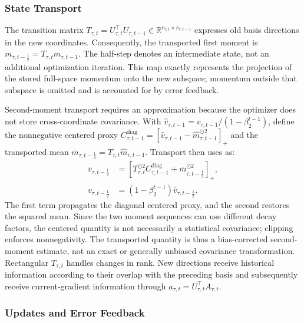 \documentclass[fleqn,10pt]{wlscirep}
\begin{document}
\subsubsection{State Transport}
\label{subsubsec:moment_transport}
\label{subsubsec:corrected_projection}
The transition matrix $T_{\tau,t}=U_{\tau,t}^{\top}U_{\tau,t-1} \in\mathbb{R}^{r_{\tau,t}\times r_{\tau,t-1}}$ expresses old basis directions in the new coordinates. Consequently, the transported first moment is $m_{\tau,t-\frac12}=T_{\tau,t}m_{\tau,t-1}$. The half-step denotes an intermediate state, not an additional optimization iteration. This map exactly represents the projection of the stored full-space momentum onto the new subspace; momentum outside that subspace is omitted and is accounted for by error feedback.

Second-moment transport requires an approximation because the optimizer does not store cross-coordinate covariance. With $\widehat v_{\tau,t-1}=v_{\tau,t-1}/(1-\beta_2^{t-1})$, define the nonnegative centered proxy $C_{\tau,t-1}^{\mathrm{diag}} =[\widehat v_{\tau,t-1}-\widehat m_{\tau,t-1}^{\odot2}]_+$ and the transported mean $\bar m_{\tau,t-\frac12}=T_{\tau,t}\widehat m_{\tau,t-1}$. Transport then uses as:
\begin{equation}
\begin{aligned}
\bar v_{\tau,t-\frac12}
&=\left[T_{\tau,t}^{\odot2}C_{\tau,t-1}^{\mathrm{diag}}
 +\bar m_{\tau,t-\frac12}^{\odot2}\right]_+,\\
v_{\tau,t-\frac12}
&=(1-\beta_2^{t-1})\bar v_{\tau,t-\frac12}.
\end{aligned}
\label{eq:second_moment_transport_unbiased}
\end{equation}
The first term propagates the diagonal centered proxy, and the second restores the squared mean. Since the two moment sequences can use different decay factors, the centered quantity is not necessarily a statistical covariance; clipping enforces nonnegativity. The transported quantity is thus a bias-corrected second-moment estimate, not an exact or generally unbiased covariance transformation. Rectangular $T_{\tau,t}$ handles changes in rank. New directions receive historical information according to their overlap with the preceding basis and subsequently receive current-gradient information through $a_{\tau,t}=U_{\tau,t}^{\top}A_{\tau,t}$.

\subsubsection{Updates and Error Feedback}
\label{subsubsec:adaptive_moment_update}
\label{subsubsec:parameter_update}
\label{subsubsec:error_buffer}
\end{document}
